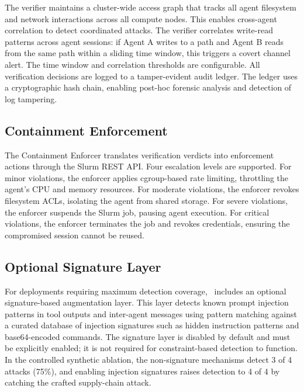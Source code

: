 The verifier maintains a cluster-wide access graph that tracks all agent filesystem and network interactions across all compute nodes. This enables cross-agent correlation to detect coordinated attacks. The verifier correlates write-read patterns across agent sessions: if Agent A writes to a path and Agent B reads from the same path within a sliding time window, this triggers a covert channel alert. The time window and correlation thresholds are configurable.
All verification decisions are logged to a tamper-evident audit ledger. The ledger uses a cryptographic hash chain, enabling post-hoc forensic analysis and detection of log tampering.

\subsection{Containment Enforcement}

The Containment Enforcer translates verification verdicts into enforcement actions through the Slurm REST API. Four escalation levels are supported. For minor violations, the enforcer applies cgroup-based rate limiting, throttling the agent's CPU and memory resources. For moderate violations, the enforcer revokes filesystem ACLs, isolating the agent from shared storage. For severe violations, the enforcer suspends the Slurm job, pausing agent execution. For critical violations, the enforcer terminates the job and revokes credentials, ensuring the compromised session cannot be reused.


\subsection{Optional Signature Layer}

For deployments requiring maximum detection coverage, \projectname~includes an optional signature-based augmentation layer. This layer detects known prompt injection patterns in tool outputs and inter-agent messages using pattern matching against a curated database of injection signatures such as hidden instruction patterns and base64-encoded commands. The signature layer is disabled by default and must be explicitly enabled; it is not required for constraint-based detection to function. In the controlled synthetic ablation, the non-signature mechanisms detect 3 of 4 attacks (75\%), and enabling injection signatures raises detection to 4 of 4 by catching the crafted supply-chain attack.

